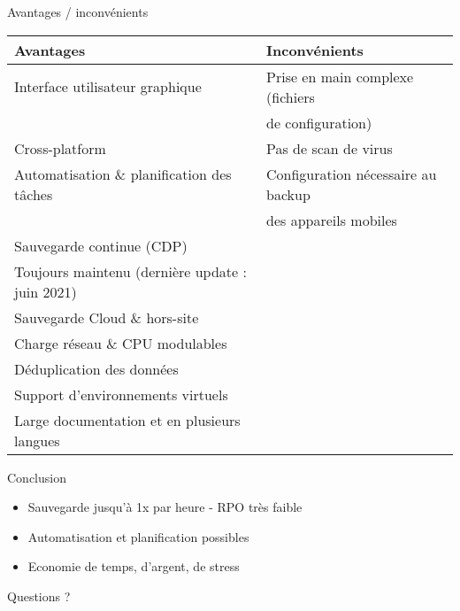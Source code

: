 \documentclass[aspectratio=169]{beamer}
\begin{document}
\begin{frame}{Avantages / inconvénients}
    \begin{center}\small
     \begin{tabular}{|l|l|}
     \hline
      \textbf{Avantages} & \textbf{Inconvénients} \\
     \hline
     \hline
        Interface utilisateur graphique & Prise en main complexe (fichiers \\ 
                                        & de configuration) \\
     \hline
     Cross-platform & Pas de scan de virus \\
     \hline
     Automatisation \& planification des tâches & Configuration nécessaire au backup \\ 
                                                & des appareils mobiles\\
     \hline
     Sauvegarde continue (CDP) & \\
     \hline
     Toujours maintenu (dernière update : juin 2021) & \\
     \hline
     Sauvegarde Cloud \& hors-site & \\
     \hline
     Charge réseau \& CPU modulables & \\
     \hline
     Déduplication des données & \\
     \hline
     Support d'environnements virtuels & \\
     \hline
     Large documentation et en plusieurs langues & \\
     \hline
     \end{tabular}

    \end{center}
\end{frame}

\begin{frame}{Conclusion}
 \begin{itemize}
  \item Sauvegarde jusqu'à 1x par heure - RPO très faible
  \item Automatisation et planification possibles
  \item Economie de temps, d'argent, de stress
 \end{itemize}
\end{frame}

\begin{frame}{Questions ?}
\end{frame}
\end{document}
